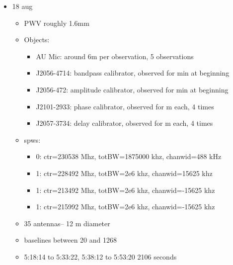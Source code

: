 \documentclass[a4paper]{tufte-handout}
\begin{document}
\begin{itemize}
	\item 18 aug
	      \begin{itemize}
	      	\item PWV roughly 1.6mm
	      	\item Objects:
	      	      \begin{itemize}
	      	      	\item AU Mic: around 6m per observation, 5 observations
	      	      	\item J2056-4714: bandpass calibrator, observed for  min at beginning
	      	      	\item J2056-472: amplitude calibrator, observed for  min at beginning
	      	      	\item J2101-2933: phase calibrator, observed for  m each, 4 times
	      	      	\item J2057-3734: delay calibrator, observed for  m each, 4 times
	      	      \end{itemize}
	      	\item spws:
	      	      \begin{itemize}
	      	      	\item 0: ctr=230538 Mhz, totBW=1875000 khz, chanwid=488 kHz
	      	      	\item 1: ctr=228492 Mhz, totBW=2e6 khz, chanwid=15625 khz
	      	      	\item 1: ctr=213492 Mhz, totBW=2e6 khz, chanwid=-15625 khz
	      	      	\item 1: ctr=215992 Mhz, totBW=2e6 khz, chanwid=-15625 khz
	      	      \end{itemize}
	      	\item 35 antennas-- 12 m diameter
	      	\item baselines between 20 and 1268
	      	\item 5:18:14 to 5:33:22, 5:38:12 to 5:53:20 2106 seconds
	      \end{itemize}


\end{itemize}
\end{document}

